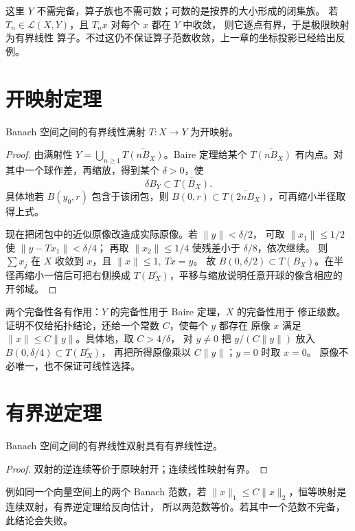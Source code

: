 这里 \(Y\) 不需完备，算子族也不需可数；可数的是按界的大小形成的闭集族。
若 \(T_n\in\mathcal L(X,Y)\)，且 \(T_nx\) 对每个 \(x\) 都在 \(Y\) 中收敛，
则它逐点有界，于是极限映射为有界线性
算子。不过这仍不保证算子范数收敛，上一章的坐标投影已经给出反例。

\section{开映射定理}

\begin{theorem}\label{thm:open-mapping-banach}
Banach 空间之间的有界线性满射 \(T:X\to Y\) 为开映射。
\end{theorem}
\begin{proof}
由满射性 \(Y=\bigcup_{n\ge1}\overline{T(nB_X)}\)。Baire 定理给某个
\(\overline{T(nB_X)}\) 有内点。对其中一个球作差，再缩放，得到某个
\(\delta>0\)，使
\[
 \delta B_Y\subset\overline{T(B_X)}.
\]
具体地若 \(B(y_0,r)\) 包含于该闭包，则
\(B(0,r)\subset\overline{T(2nB_X)}\)，可再缩小半径取得上式。

现在把闭包中的近似原像改造成实际原像。若 \(\|y\|<\delta/2\)，
可取 \(\|x_1\|\le1/2\) 使 \(\|y-Tx_1\|<\delta/4\)；
再取 \(\|x_2\|\le1/4\) 使残差小于 \(\delta/8\)，依次继续。
则 \(\sum x_j\) 在 \(X\) 收敛到 \(x\)，且 \(\|x\|\le1,\ Tx=y\)。
故 \(B(0,\delta/2)\subset T(B_X)\)。在半径再缩小一倍后可把右侧换成
\(T(B_X^\circ)\)，平移与缩放说明任意开球的像含相应的开邻域。
\end{proof}

两个完备性各有作用：\(Y\) 的完备性用于 Baire 定理，\(X\) 的完备性用于
修正级数。证明不仅给拓扑结论，还给一个常数 \(C\)，使每个 \(y\) 都存在
原像 \(x\) 满足 \(\|x\|\le C\|y\|\)。具体地，取 \(C>4/\delta\)，
对 \(y\ne0\) 把 \(y/(C\|y\|)\) 放入 \(B(0,\delta/4)\subset T(B_X^\circ)\)，
再把所得原像乘以 \(C\|y\|\)；\(y=0\) 时取 \(x=0\)。
原像不必唯一，也不保证可线性选择。

\section{有界逆定理}

\begin{corollary}\label{cor:bounded-inverse}
Banach 空间之间的有界线性双射具有有界线性逆。
\end{corollary}
\begin{proof}
双射的逆连续等价于原映射开；连续线性映射有界。
\end{proof}

例如同一个向量空间上的两个 Banach 范数，若
\(\|x\|_1\le C\|x\|_2\)，恒等映射是连续双射，有界逆定理给反向估计，
所以两范数等价。若其中一个范数不完备，此结论会失败。


